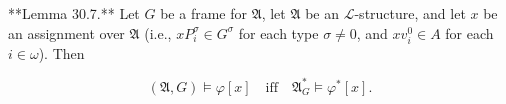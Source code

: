 **Lemma 30.7.** Let $G$ be a frame for $\mathfrak{A}$, let $\mathfrak{A}$ be an $\mathcal{L}$-structure, and let $x$ be an assignment over $\mathfrak{A}$ (i.e., $xP_i^\sigma \in G^\sigma$ for each type $\sigma \neq 0$, and $xv_i^0 \in A$ for each $i \in \omega$). Then

$$(\mathfrak{A}, G) \models \varphi[x] \quad \text{iff} \quad \mathfrak{A}_G^* \models \varphi^*[x].$$
